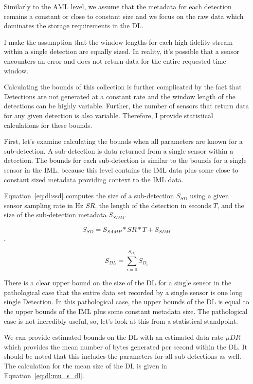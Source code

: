 Similarly to the AML level, we assume that the metadata for each detection remains a constant or close to constant size and we focus on the raw data which dominates the storage requirements in the DL\@.

I make the assumption that the window lengths for each high-fidelity stream within a single detection are equally sized. In reality, it's possible that a sensor encounters an error and does not return data for the entire requested time window.

Calculating the bounds of this collection is further complicated by the fact that Detections are not generated at a constant rate and the window length of the detections can be highly variable. Further, the number of sensors that return data for any given detection is also variable. Therefore, I provide statistical calculations for these bounds.

First, let's examine calculating the bounds when all parameters are known for a sub-detection. A sub-detection is data returned from a single sensor within a detection. The bounds for each sub-detection is similar to the bounds for a single sensor in the IML, because this level contains the IML data plus some close to constant sized metadata providing context to the IML data.

Equation~\ref{eq:dl:ssd} computes the size of a sub-detection $S_{SD}$ using a given sensor sampling rate in Hz $SR$, the length of the detection in seconds $T$, and the size of the sub-detection metadata $S_{SDM}$.

\begin{equation}\label{eq:dl:ssd}
	S_{SD} = S_{SAMP} * SR * T + S_{SDM}
\end{equation}.

\begin{equation}\label{eq:dl:dl}
	S_{DL} = \sum_{i=0}^{S_{D_{n}}} S_{D_{i}}
\end{equation}

There is a clear upper bound on the size of the DL for a single sensor in the pathological case that the entire data set recorded by a single sensor is one long single Detection. In this pathological case, the upper bounds of the DL is equal to the upper bounds of the IML plus some constant metadata size. The pathological case is not incredibly useful, so, let's look at this from a statistical standpoint.

We can provide estimated bounds on the DL with an estimated data rate $\mu DR$ which provides the mean number of bytes generated per second within the DL\@. It should be noted that this includes the parameters for all sub-detections as well. The calculation for the mean size of the DL is given in Equation~\ref{eq:dl:mu_s_dl}.

